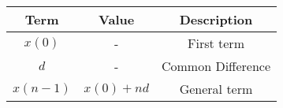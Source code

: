 \begin{tabular}{|c|c|c|}
    \hline
    \textbf{Term} & \textbf{Value} & \textbf{Description}\\
    \hline
    $x(0)$ & - & First term\\
    \hline
    $d$ & - & Common Difference\\
    \hline
    $x(n-1)$ & $x(0)+nd$ & General term\\
    \hline
  \end{tabular}
  
